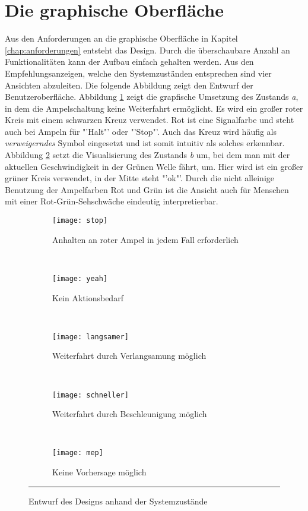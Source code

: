 \section{Die graphische Oberfläche}
Aus den Anforderungen an die graphische Oberfläche in Kapitel \ref{chap:anforderungen} entsteht das Design. Durch die überschaubare Anzahl an Funktionalitäten kann der Aufbau einfach gehalten werden. Aus den Empfehlungsanzeigen, welche den Systemzuständen entsprechen sind vier Ansichten abzuleiten. Die folgende Abbildung zeigt den Entwurf der Benutzeroberfläche.
Abbildung \ref{fig:stop} zeigt die grapfische Umsetzung des Zustands \textit{a}, in dem die Ampelschaltung keine Weiterfahrt ermöglicht. Es wird ein großer roter Kreis mit einem schwarzen Kreuz verwendet. Rot ist eine Signalfarbe und steht auch bei Ampeln für "'Halt"' oder "'Stop"'. Auch das Kreuz wird häufig als \textit{verweigerndes} Symbol eingesetzt und ist somit intuitiv als solches erkennbar.\\
Abbildung \ref{fig:yeah} setzt die Visualisierung des Zustands \textit{b} um, bei dem man mit der aktuellen Geschwindigkeit in der Grünen Welle fährt, um. Hier wird ist ein großer grüner Kreis verwendet, in der Mitte steht "'ok"'. Durch die nicht alleinige Benutzung der Ampelfarben Rot und Grün ist die Ansicht auch für Menschen mit einer Rot-Grün-Sehschwäche eindeutig interpretierbar.
\begin{figure}[H]
        \centering
           \begin{subfigure}[t]{0.18\textwidth}
                \texttt{[image: stop]}
                \caption[Systemzustand a]{Anhalten an roter Ampel in jedem Fall erforderlich}
                \label{fig:stop}
        \end{subfigure}
           ~ 
              \begin{subfigure}[t]{0.18\textwidth}
                \texttt{[image: yeah]}
                \caption[Systemzustand b]{Kein Aktionsbedarf}
                \label{fig:yeah}
        \end{subfigure}
           ~
        \begin{subfigure}[t]{0.18\textwidth}
                \texttt{[image: langsamer]}
                \caption[Systemzustand c]{Weiterfahrt durch Verlangsamung  möglich}
                \label{fig:langsamer}
        \end{subfigure}
        ~
        \begin{subfigure}[t]{0.18\textwidth}
                \texttt{[image: schneller]}
                \caption[Systemzustand d]{Weiterfahrt durch Beschleunigung möglich}
                \label{fig:schneller}
        \end{subfigure} 
        ~ 
        \begin{subfigure}[t]{0.18\textwidth}
        	\texttt{[image: mep]}
        	\caption[Systemzustand e]{Keine Vorhersage möglich}
            \label{fig:meh}
        \end{subfigure} 
        \rule{35em}{0.5pt}   
        \caption[Systemzustände im Ampelbereich]{Entwurf des Designs anhand der Systemzustände}
        \label{fig:mockup}
\end{figure}
